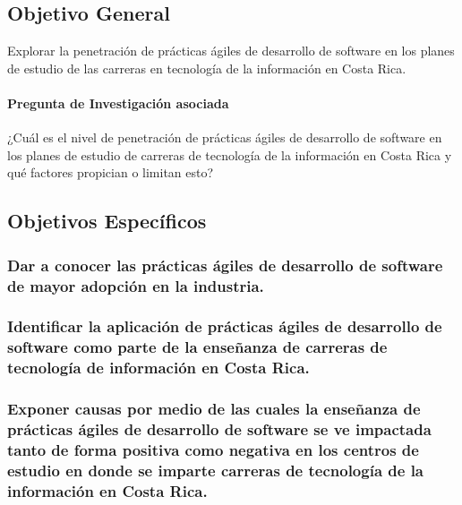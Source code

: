 \documentclass[journal]{IEEEtran}
\begin{document}
\subsection{Objetivo General}
Explorar la penetración de prácticas ágiles de desarrollo de software en los planes de estudio de las carreras en tecnología de la información en Costa Rica.

\paragraph{Pregunta de Investigación asociada} ¿Cuál es el nivel de penetración de prácticas ágiles de desarrollo de software en los planes de estudio de carreras de tecnología de la información en Costa Rica y qué factores propician o limitan esto?


\subsection{Objetivos Específicos}

\subsubsection{Dar a conocer las prácticas ágiles de desarrollo de software de mayor adopción en la industria.} \label{sec:objetivo-especifico-1}

\subsubsection{Identificar la aplicación de prácticas ágiles de desarrollo de software como parte de la enseñanza de carreras de tecnología de información en Costa Rica.} \label{sec:objetivo-especifico-2}

\subsubsection{Exponer causas por medio de las cuales la enseñanza de prácticas ágiles de desarrollo de software se ve impactada tanto de forma positiva como negativa en los centros de estudio en donde se imparte carreras de tecnología de la información en Costa Rica.} \label{sec:objetivo-especifico-3}
\end{document}
